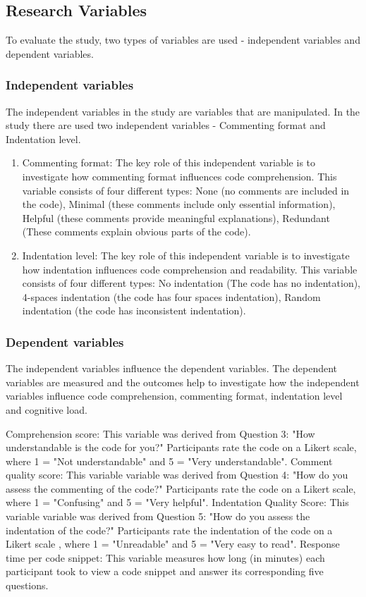 \subsection{Research Variables}
To evaluate the study, two types of variables are used - independent variables and dependent variables.

\subsubsection{Independent variables}

The independent variables in the study are variables that are manipulated. In the study there are used two independent variables - Commenting format and Indentation level.

\begin{enumerate}
     \item Commenting format: The key role of this independent variable is to investigate how commenting format influences code comprehension. This variable consists of four different types: None (no comments are included in the code), Minimal (these comments include only essential information), Helpful (these comments provide meaningful explanations), Redundant (These comments explain obvious parts of the code). 

    \item Indentation level: The key role of this independent variable is to investigate how indentation influences code comprehension and readability. This variable consists of four different types: No indentation (The code has no indentation), 4-spaces indentation (the code has four spaces indentation), Random indentation (the code has inconsistent indentation). 
\end{enumerate}

\subsubsection{Dependent variables}

The independent variables influence the dependent variables. The dependent variables are measured and the outcomes help to investigate how the independent variables influence code comprehension, commenting format, indentation level and cognitive load.  

Comprehension score: This variable was derived from Question 3: "How understandable is the code for you?" Participants rate the code on a Likert scale, where 1 = "Not understandable" and  5 = "Very understandable". 
Comment quality score: This variable variable was derived from Question 4: "How do you assess the commenting of the code?" Participants rate the code on a Likert scale, where 1 = "Confusing"  and 5  = "Very helpful". 
Indentation Quality Score: This variable variable was derived from Question 5: "How do you assess the indentation of the code?" Participants rate the indentation of the code on  a Likert scale , where 1 = "Unreadable"  and 5 = "Very easy to read". 
Response time per code snippet: This variable measures how long (in minutes) each participant took to view a code snippet and answer its corresponding five questions. 



